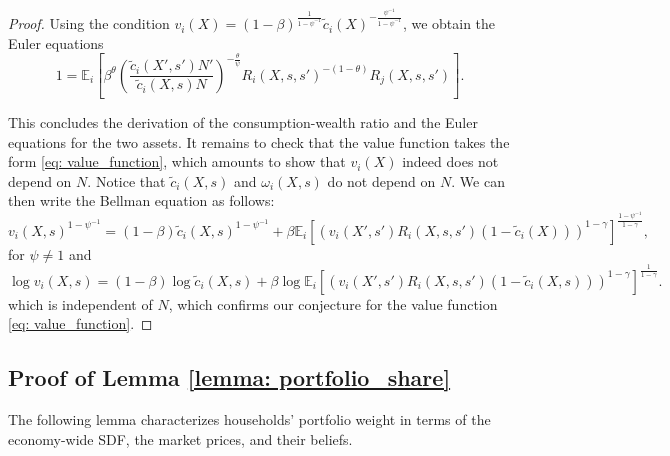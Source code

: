 \begin{proof}
Using the condition $v_i(X) = (1-\beta)^{\frac{1}{1-\psi^{-1}}} \tilde{c}_i(X)^{-\frac{\psi^{-1}}{1-\psi^{-1}}}$, we obtain the Euler equations
\begin{equation}
    1 = \mathbb{E}_i\left[ \beta^\theta \left(\frac{\tilde{c}_i(X',s') N'}{\tilde{c}_i(X,s) N}\right)^{-\frac{\theta}{\psi}} R_{i}(X,s,s')^{-(1-\theta)} R_j(X,s,s') \right].
\end{equation}

This concludes the derivation of the consumption-wealth ratio and the Euler equations for the two assets. It remains to check that the value function takes the form \eqref{eq: value_function}, which amounts to show that $v_i(X)$ indeed does not depend on $N$. Notice that $\tilde{c}_i(X,s)$ and $\omega_i(X,s)$ do not depend on $N$. We can then write the Bellman equation as follows:
\begin{equation}
    v_i(X,s)^{1-\psi^{-1}} =  (1-\beta) \tilde{c}_i(X,s)^{1-\psi^{-1}} + \beta \mathbb{E}_i\left[ (v_i(X',s')R_{i}(X,s,s')(1-\tilde{c}_i(X)))^{1-\gamma}\right]^{\frac{1-\psi^{-1}}{1-\gamma}},
\end{equation}
for $\psi \neq 1$ and
\begin{equation}
    \log v_i(X,s) = (1-\beta) \log \tilde{c}_i(X,s) + \beta \log \mathbb{E}_i\left[ (v_i(X',s')R_{i}(X,s,s')(1-\tilde{c}_i(X,s)))^{1-\gamma}\right]^{\frac{1}{1-\gamma}}.
\end{equation}
which is independent of $N$, which confirms our conjecture for the value function \eqref{eq: value_function}.


\end{proof}


\subsection{Proof of Lemma \ref{lemma: portfolio_share}}\label{app: proof_portfolio_share}
    
The following lemma characterizes households' portfolio
weight in terms of the economy-wide SDF, the market
prices, and their beliefs.

